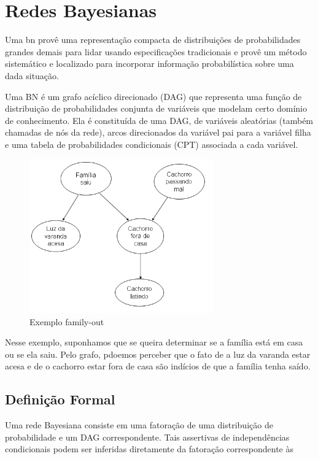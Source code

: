 \chapter{Redes Bayesianas}%
Uma \gls{bn} provê uma representação compacta de distribuições de probabilidades grandes demais para lidar usando especificações tradicionais e provê um método sistemático e localizado para incorporar informação probabilística sobre uma dada situação.

Uma BN é um grafo acíclico direcionado (DAG) que representa uma função de distribuição de probabilidades conjunta de variáveis que modelam certo domínio de conhecimento. Ela é constituída de uma DAG, de variáveis aleatórias (também chamadas de nós da rede), arcos direcionados da variável pai para a variável filha e uma tabela de probabilidades condicionais (CPT) associada a cada variável.
\begin{figure}[H]
	\centering
	\includegraphics[width = 300px]{figuras/BN1}
	\caption[extraída do artigo do Laecio]{Exemplo family-out}
	\label{fig:familyBN}
\end{figure}

Nesse exemplo, suponhamos que se queira determinar se a família está em casa ou se ela saiu. Pelo grafo, pdoemos perceber que o fato de a luz da varanda estar acesa e de o cachorro estar fora de casa são indícios de que a família tenha saído. 

\section{Definição Formal}
Uma rede Bayesiana consiste em uma fatoração de uma distribuição de probabilidade e um DAG correspondente. Tais assertivas de independências condicionais podem ser inferidas diretamente da fatoração correspondente às 